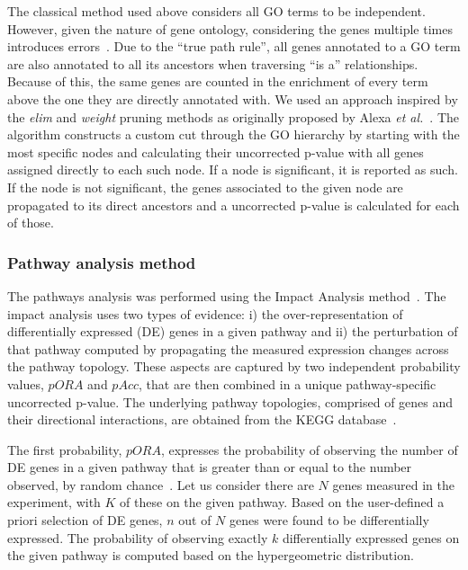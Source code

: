 The classical method used above considers all GO terms to be independent. However, given the nature of gene ontology, considering the genes multiple times introduces errors~\cite{Rhee:2008,DraghiciBook:2011}. Due to the ``true path rule'', all  genes annotated to a GO term are also annotated to all its ancestors when traversing ``is a'' relationships. Because of this, the same genes are counted in the enrichment of every term above the one they are directly annotated with.  We used an approach inspired by  the \textit{elim} and \emph{weight} pruning methods as originally proposed by Alexa \textit{et al.}~\cite{Alexa:2006}. The algorithm constructs a custom cut through the GO hierarchy by starting with the most specific nodes and calculating their uncorrected p-value with all genes assigned directly to each such node. If a node is significant, it is reported as such. If the node is not significant, the genes associated to the given node are propagated to its direct ancestors and a uncorrected p-value is calculated for each of those. 

\subsubsection{Pathway analysis method}  

The pathways analysis was performed using the Impact Analysis method~\cite{DraghiciPE:2007, tarca2009novel, khatri2007}. The impact analysis uses two types of evidence: i) the over-representation of differentially expressed (DE) genes in a given pathway and ii) the perturbation of that pathway computed by propagating the measured expression changes across the pathway topology. These aspects are captured by two independent probability values, $pORA$ and $pAcc$, that are then combined in a unique pathway-specific uncorrected p-value. The underlying pathway topologies, comprised of genes and their directional interactions, are obtained from the KEGG database~\cite{ogata1999kegg, kanehisa2010kegg, kanehisa2012kegg,  kanehisa2014data}.

The first probability, $pORA$, expresses the probability of observing the number of DE genes in a given pathway that is greater than or equal to the number observed, by random chance~\cite{DraghiciOE2:2003,DraghiciBook:2011}. Let us consider there are $N$ genes measured in the experiment, with $K$ of these on the given pathway. Based on the user-defined a priori selection of DE genes, $n$ out of $N$ genes were found to be differentially expressed. The probability of observing exactly $k$ differentially expressed genes on the given pathway is computed based on the hypergeometric distribution.

